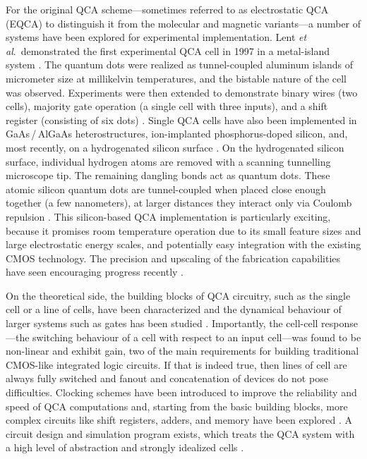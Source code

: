For the original QCA scheme---sometimes referred to as electrostatic QCA (EQCA)
to distinguish it from the molecular and magnetic variants---a number of systems
have been explored for experimental implementation. Lent \emph{et al}.\
demonstrated the first experimental QCA cell in 1997 in a metal-island system
\cite{orlov1997realization}. The quantum dots were realized as tunnel-coupled
aluminum islands of micrometer size at millikelvin temperatures, and the
bistable nature of the cell was observed.  Experiments were then extended to
demonstrate binary wires (two cells), majority gate operation (a single cell
with three inputs), and a shift register (consisting of six dots)
\cite{orlov1999experimental} \cite{amlani1999digital}
\cite{kummamuru2003operation}. Single QCA cells have also been implemented in
GaAs\,/\,AlGaAs heterostructures, ion-implanted phosphorus-doped silicon, and,
most recently, on a hydrogenated silicon surface \cite{gardelis2003evidence}
\cite{mitic2006demonstration} \cite{haider2009controlled}. On the hydrogenated
silicon surface, individual hydrogen atoms are removed with a scanning
tunnelling microscope tip. The remaining dangling bonds act as quantum dots.
These atomic silicon quantum dots are tunnel-coupled when placed close enough
together (a few nanometers), at larger distances they interact only via Coulomb
repulsion \cite{pitters2011tunnel}. This silicon-based QCA implementation is
particularly exciting, because it promises room temperature operation due to its
small feature sizes and large electrostatic energy scales, and potentially easy
integration with the existing CMOS technology. The precision and upscaling of
the fabrication capabilities have seen encouraging progress recently
\cite{wolkow2013silicon}.


On the theoretical side, the building blocks of QCA circuitry, such as the
single cell or a line of cells, have been characterized and the dynamical
behaviour of larger systems such as gates has been studied \cite{lent1993lines}
\cite{tougaw1996dynamic}. Importantly, the cell-cell response---the switching
behaviour of a cell with respect to an input cell---was found to be non-linear
and exhibit gain, two of the main requirements for building traditional
CMOS-like integrated logic circuits. If that is indeed true, then lines of cell
are always fully switched and fanout and concatenation of devices do not pose
difficulties.  Clocking schemes have been introduced to improve the reliability
and speed of QCA computations and, starting from the basic building blocks, more
complex circuits like shift registers, adders, and memory have been explored
\cite{lent1997device} \cite{hennessy2001clocking} \cite{rahimi2008quantum}. A
circuit design and simulation program exists, which treats the QCA system with a
high level of abstraction and strongly idealized cells
\cite{walus2004qcadesigner}.

